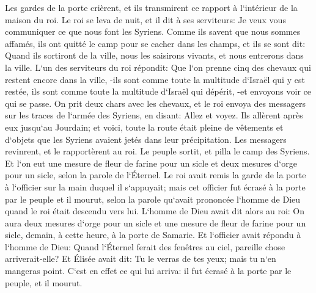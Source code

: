 \verse Les gardes de la porte crièrent, et ils transmirent ce rapport à l`intérieur de la maison du roi. 
\verse Le roi se leva de nuit, et il dit à ses serviteurs: Je veux vous communiquer ce que nous font les Syriens. Comme ils savent que nous sommes affamés, ils ont quitté le camp pour se cacher dans les champs, et ils se sont dit: Quand ils sortiront de la ville, nous les saisirons vivants, et nous entrerons dans la ville. 
\verse L`un des serviteurs du roi répondit: Que l`on prenne cinq des chevaux qui restent encore dans la ville, -ils sont comme toute la multitude d`Israël qui y est restée, ils sont comme toute la multitude d`Israël qui dépérit, -et envoyons voir ce qui se passe. 
\verse On prit deux chars avec les chevaux, et le roi envoya des messagers sur les traces de l`armée des Syriens, en disant: Allez et voyez. 
\verse Ils allèrent après eux jusqu`au Jourdain; et voici, toute la route était pleine de vêtements et d`objets que les Syriens avaient jetés dans leur précipitation. Les messagers revinrent, et le rapportèrent au roi. 
\verse Le peuple sortit, et pilla le camp des Syriens. Et l`on eut une mesure de fleur de farine pour un sicle et deux mesures d`orge pour un sicle, selon la parole de l`Éternel. 
\verse Le roi avait remis la garde de la porte à l`officier sur la main duquel il s`appuyait; mais cet officier fut écrasé à la porte par le peuple et il mourut, selon la parole qu`avait prononcée l`homme de Dieu quand le roi était descendu vers lui. 
\verse L`homme de Dieu avait dit alors au roi: On aura deux mesures d`orge pour un sicle et une mesure de fleur de farine pour un sicle, demain, à cette heure, à la porte de Samarie. 
\verse Et l`officier avait répondu à l`homme de Dieu: Quand l`Éternel ferait des fenêtres au ciel, pareille chose arriverait-elle? Et Élisée avait dit: Tu le verras de tes yeux; mais tu n`en mangeras point. 
\verse C`est en effet ce qui lui arriva: il fut écrasé à la porte par le peuple, et il mourut. 

\chapter{}

